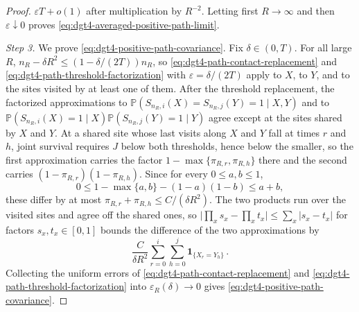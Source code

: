 \documentclass[11pt]{amsart}
\theoremstyle{plain}
\theoremstyle{definition}
\renewcommand{\P}{\mathbb{P}}
\newcommand{\one}{\mathbf{1}}
\begin{document}
\begin{proof}
	$\varepsilon T+o(1)$ after multiplication by $R^{-2}$. Letting first
	$R\to\infty$ and then $\varepsilon\downarrow0$ proves
	\eqref{eq:dgt4-averaged-positive-path-limit}.
	\par\smallskip\noindent\emph{Step 3.} We prove
	\eqref{eq:dgt4-positive-path-covariance}.
	Fix $\delta\in(0,T)$. For all large $R$, $n_R-\delta R^2\leq(1-\delta/(2T))n_R$, so
	\eqref{eq:dgt4-path-contact-replacement} and \eqref{eq:dgt4-path-threshold-factorization}
	with $\varepsilon=\delta/(2T)$ apply to $X$, to $Y$, and to the sites visited by at least
	one of them. After the threshold replacement, the factorized approximations to
	$\P(S_{n_R,i}(X)=S_{n_R,j}(Y)=1\mid X,Y)$ and to
	$\P(S_{n_R,i}(X)=1\mid X)\P(S_{n_R,j}(Y)=1\mid Y)$ agree except at the sites shared by $X$
	and $Y$. At a shared site whose last visits along $X$ and $Y$ fall at times $r$ and $h$,
	joint survival requires $J$ below both thresholds, hence below the smaller, so the first
	approximation carries the factor $1-\max\{\pi_{R,r},\pi_{R,h}\}$ there and the second carries
	$(1-\pi_{R,r})(1-\pi_{R,h})$. Since for every $0\leq a,b\leq1$,
	\[
		0\leq1-\max\{a,b\}-(1-a)(1-b)\leq a+b,
	\]
	these differ by at most $\pi_{R,r}+\pi_{R,h}\leq C/(\delta R^2)$. The two products run over
	the visited sites and agree off the shared ones, so
	$\bigl|\prod_x s_x-\prod_x t_x\bigr|\leq\sum_x|s_x-t_x|$ for factors $s_x,t_x\in[0,1]$ bounds
	the difference of the two approximations by
	\[
		\frac{C}{\delta R^2}
		\sum_{r=0}^i\sum_{h=0}^j\one_{\{X_r=Y_h\}}\, .
	\]
	Collecting the uniform errors of \eqref{eq:dgt4-path-contact-replacement} and
	\eqref{eq:dgt4-path-threshold-factorization} into $\varepsilon_R(\delta)\to0$ gives
	\eqref{eq:dgt4-positive-path-covariance}.
\end{proof}
\end{document}
